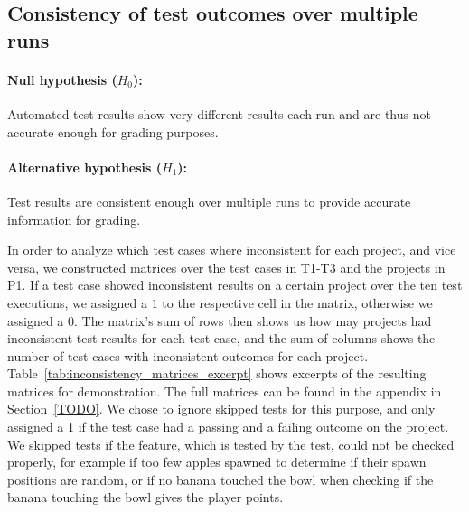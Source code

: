 \clearpage

\subsection{Consistency of test outcomes over multiple runs}

\paragraph{Null hypothesis ($H_0$):}
Automated test results show very different results each run and are thus not accurate enough for grading purposes.
\vspace{-\medskipamount}
\paragraph{Alternative hypothesis ($H_1$):}
Test results are consistent enough over multiple runs to provide accurate information for grading.
\parspace

In order to analyze which test cases where inconsistent for each project, and vice versa,
we constructed matrices over the test cases in T1-T3 and the projects in P1.
If a test case showed inconsistent results on a certain project over the ten test executions,
we assigned a $1$ to the respective cell in the matrix, otherwise we assigned a 0.
The matrix's sum of rows then shows us how may projects had inconsistent test results for each test case,
and the sum of columns shows the number of test cases with inconsistent outcomes for each project.
Table~\ref{tab:inconsistency_matrices_excerpt} shows excerpts of the resulting matrices for demonstration.
The full matrices can be found in the appendix in Section~\ref{TODO}.
We chose to ignore skipped tests for this purpose,
and only assigned a 1 if the test case had a passing and a failing outcome on the project.
We skipped tests if the feature, which is tested by the test, could not be checked properly,
for example if too few apples spawned to determine if their spawn positions are random,
or if no banana touched the bowl when checking if the banana touching the bowl gives the player points.
\parspace

